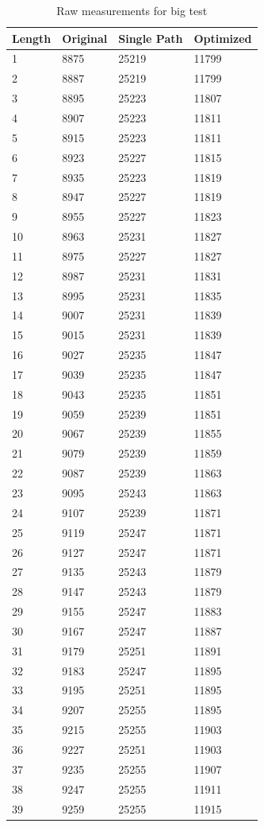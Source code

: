 \documentclass[a4paper,english,12pt,oneside]{article}
\begin{document}
\begin{longtable}{|l|l|l|l|}
\caption{Raw measurements for big test}
\tabularnewline
\hline
\textbf{Length} & \textbf{Original} & \textbf{Single Path} & \textbf{Optimized} \tabularnewline\endhead
1&8875&25219&11799\\
2&8887&25219&11799\\
3&8895&25223&11807\\
4&8907&25223&11811\\
5&8915&25223&11811\\
6&8923&25227&11815\\
7&8935&25223&11819\\
8&8947&25227&11819\\
9&8955&25227&11823\\
10&8963&25231&11827\\
11&8975&25227&11827\\
12&8987&25231&11831\\
13&8995&25231&11835\\
14&9007&25231&11839\\
15&9015&25231&11839\\
16&9027&25235&11847\\
17&9039&25235&11847\\
18&9043&25235&11851\\
19&9059&25239&11851\\
20&9067&25239&11855\\
21&9079&25239&11859\\
22&9087&25239&11863\\
23&9095&25243&11863\\
24&9107&25239&11871\\
25&9119&25247&11871\\
26&9127&25247&11871\\
27&9135&25243&11879\\
28&9147&25243&11879\\
29&9155&25247&11883\\
30&9167&25247&11887\\
31&9179&25251&11891\\
32&9183&25247&11895\\
33&9195&25251&11895\\
34&9207&25255&11895\\
35&9215&25255&11903\\
36&9227&25251&11903\\
37&9235&25255&11907\\
38&9247&25255&11911\\
39&9259&25255&11915\\

\end{longtable}
\end{document}
